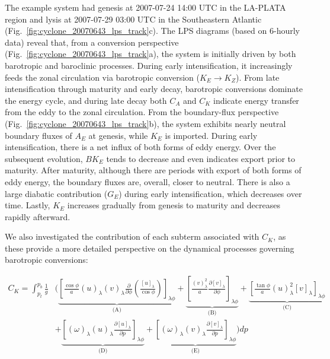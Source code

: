 \documentclass[pdflatex,sn-chicago]{sn-jnl}%
\theoremstyle{plain}
\theoremstyle{definition}
\theoremstyle{remark}
\theoremstyle{definition}
\begin{document}
The example system had genesis at 2007-07-24 14:00 UTC in the LA-PLATA region and lysis at 2007-07-29 03:00 UTC in the Southeastern Atlantic (Fig.~\ref{fig:cyclone_20070643_lps_track}c). The LPS diagrams (based on 6-hourly data) reveal that, from a conversion perspective (Fig.~\ref{fig:cyclone_20070643_lps_track}a), the system is initially driven by both barotropic and baroclinic processes. During early intensification, it increasingly feeds the zonal circulation via barotropic conversion ($K_E \rightarrow K_Z$). From late intensification through maturity and early decay, barotropic conversions dominate the energy cycle, and during late decay both $C_A$ and $C_K$ indicate energy transfer from the eddy to the zonal circulation. From the boundary-flux perspective (Fig.~\ref{fig:cyclone_20070643_lps_track}b), the system exhibits nearly neutral boundary fluxes of $A_E$ at genesis, while $K_E$ is imported. During early intensification, there is a net influx of both forms of eddy energy. Over the subsequent evolution, $BK_E$ tends to decrease and even indicates export prior to maturity. After maturity, although there are periods with export of both forms of eddy energy, the boundary fluxes are, overall, closer to neutral. There is also a large diabatic contribution ($G_E$) during early intensification, which decreases over time. Lastly, $K_E$ increases gradually from genesis to maturity and decreases rapidly afterward.


We also investigated the contribution of each subterm associated with $C_K$, as these provide a more detailed perspective on the dynamical processes governing barotropic conversions:


\begin{equation}
\begin{split}
C_K = \int_{p_t}^{p_b} \frac{1}{g}  & \Bigg( \underbrace{ \left[ \frac{\cos\phi}{a} (u)_{\lambda} (v)_{\lambda} \frac{\partial}{\partial\phi} \left(\frac{[u]_{\lambda}}{\cos\phi}\right) \right]_{\lambda\phi}}_{\text{(A)}} + \underbrace{\left[ \frac{(v)_{\lambda}^2}{a} \frac{\partial [v]_{\lambda}}{\partial\phi}\right]_{\lambda\phi}}_{\text{(B)}} + \underbrace{\left[ \frac{\tan\phi}{a} (u)_{\lambda}^2 [v]_{\lambda}\right]_{\lambda\phi}}_{\text{(C)}} \\
& + \underbrace{ \left[(\omega)_{\lambda}  (u)_{\lambda} \frac{\partial [u]_{\lambda}}{\partial p}\right]_{\lambda\phi}}_{\text{(D)}} + \underbrace{ \left[(\omega)_{\lambda}  (v)_{\lambda} \frac{\partial [v]_{\lambda}}{\partial p}\right]_{\lambda\phi}}_{\text{(E)}} \Bigg)  dp
\end{split}
\label{eq:CK}
\end{equation}
\end{document}
